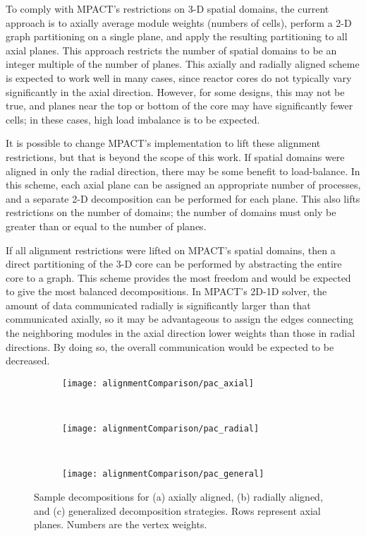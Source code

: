 {{    To comply with MPACT's restrictions on 3-D spatial domains, the current approach is to axially average module weights (numbers of cells), perform a 2-D graph partitioning on a single plane, and apply the resulting partitioning to all axial planes.
    This approach restricts the number of spatial domains to be an integer multiple of the number of planes.
    This axially and radially aligned scheme is expected to work well in many cases, since reactor cores do not typically vary significantly in the axial direction.
    However, for some designs, this may not be true, and planes near the top or bottom of the core may have significantly fewer cells; in these cases, high load imbalance is to be expected.

    It is possible to change MPACT's implementation to lift these alignment restrictions, but that is beyond the scope of this work.
    If spatial domains were aligned in only the radial direction, there may be some benefit to load-balance.
    In this scheme, each axial plane can be assigned an appropriate number of processes, and a separate 2-D decomposition can be performed for each plane.
    This also lifts restrictions on the number of domains; the number of domains must only be greater than or equal to the number of planes.

    If all alignment restrictions were lifted on MPACT's spatial domains, then a direct partitioning of the 3-D core can be performed by abstracting the entire core to a graph.
    This scheme provides the most freedom and would be expected to give the most balanced decompositions.
    In MPACT's 2D-1D solver, the amount of data communicated radially is significantly larger than that communicated axially, so it may be advantageous to assign the edges connecting the neighboring modules in the axial direction lower weights than those in radial directions.
    By doing so, the overall communication would be expected to be decreased.

    \begin{figure}
      \centering
      \begin{subfigure}[t]{0.3\textwidth}
        \centering
        \texttt{[image: alignmentComparison/pac\_axial]}
        \caption{}
      \end{subfigure}%
      ~
      \begin{subfigure}[t]{0.3\textwidth}
        \centering
        \texttt{[image: alignmentComparison/pac\_radial]}
        \caption{}
      \end{subfigure}%
      ~
      \begin{subfigure}[t]{0.3\textwidth}
        \centering
        \texttt{[image: alignmentComparison/pac\_general]}
        \caption{}
      \end{subfigure}
      \caption{
        Sample decompositions for (a) axially aligned, (b) radially aligned, and (c) generalized decomposition strategies.
        Rows represent axial planes.
        Numbers are the vertex weights.
        \label{fig:Spatial Decomposition:partitionAlignmentComparison}
      }
    \end{figure}

}}
